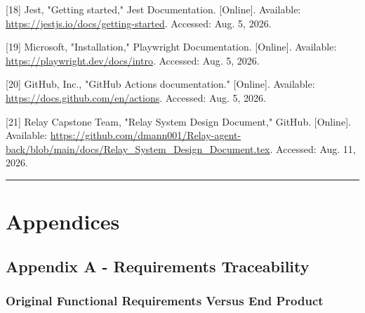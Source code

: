 \documentclass[
]{report}
\begin{document}
{[}18{]} Jest, "Getting started," Jest Documentation. {[}Online{]}.
Available: \url{https://jestjs.io/docs/getting-started}. Accessed: Aug.
5, 2026.

{[}19{]} Microsoft, "Installation," Playwright Documentation.
{[}Online{]}. Available: \url{https://playwright.dev/docs/intro}.
Accessed: Aug. 5, 2026.

{[}20{]} GitHub, Inc., "GitHub Actions documentation." {[}Online{]}.
Available: \url{https://docs.github.com/en/actions}. Accessed: Aug. 5,
2026.

{[}21{]} Relay Capstone Team, "Relay System Design Document," GitHub.
{[}Online{]}. Available:
\url{https://github.com/dmann001/Relay-agent-back/blob/main/docs/Relay_System_Design_Document.tex}.
Accessed: Aug. 11, 2026.

\begin{center}\rule{0.5\linewidth}{0.5pt}\end{center}

\chapter{Appendices}\label{appendices}

\section{Appendix A - Requirements
Traceability}\label{appendix-a---requirements-traceability}

\subsection{Original Functional Requirements Versus End Product}
\end{document}
